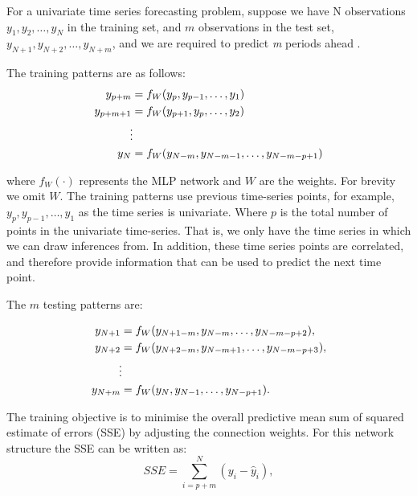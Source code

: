 
For a univariate time series forecasting problem, suppose we have N observations $y_1, y_2, \ldots, y_N$ in the training set, and $m$ observations in the test set, $y_{N+1}, y_{N+2}, \ldots, y_{N+m}$, and we are required to predict \textit{m} periods ahead \cite{Pao2007}. 

The training patterns are as follows:
\begin{align}
y_{p+m} & =f_{W}(y_p, y_{p-1},\ldots,y_1)\\
y_{p+m+1} & =f_{W}(y_{p+1}, y_{p},\ldots,y_2)\\
&\vdotswithin  \notag \\
y_{N} & =f_{W}(y_{N-m},y_{N-m-1},\ldots,y_{N-m-p+1})
\end{align}

\noindent where $f_{W}(\cdot)$ represents the MLP network and $W$ are the weights. For brevity we omit $W$. The training patterns use previous time-series points, for example, $y_p, y_{p-1},\ldots,y_1$ as the time series is univariate. Where $p$ is the total number of points in the univariate time-series. That is, we only have the time series in which we can draw inferences from. In addition, these time series points are correlated, and therefore provide information that can be used to predict the next time point.

The $m$ testing patterns are:

\begin{align}
y_{N+1} & =f_{W}(y_{N+1-m}, y_{N-m},\ldots,y_{N-m-p+2}),\\
y_{N+2} & =f_{W}(y_{N+2-m}, y_{N-m+1},\ldots,y_{N-m-p+3}),\\
&\vdotswithin  \notag \\
y_{N+m} & =f_{W}(y_{N},y_{N-1},\ldots,y_{N-p+1}).
\end{align}

The training objective is to minimise the overall predictive mean sum of squared estimate of errors (SSE) by adjusting the connection weights. For this network structure the SSE can be written as:
\begin{equation}
SSE = \sum_{i=p+m}^N(y_i-\hat{y}_i),
\end{equation}

